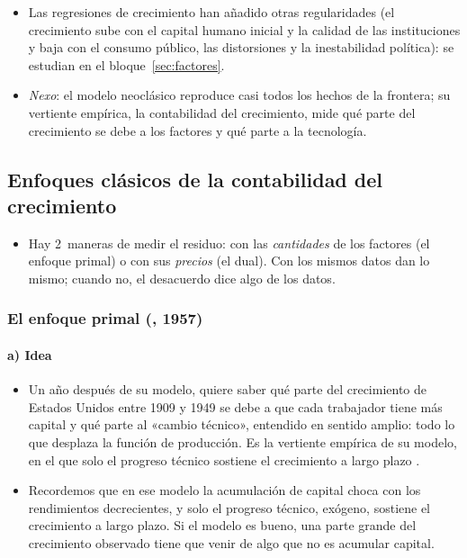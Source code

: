 \documentclass[11pt]{article}
\begin{document}
\begin{itemize}
\item Las regresiones de crecimiento han añadido otras regularidades (el crecimiento sube con el capital humano inicial y la calidad de las instituciones y baja con el consumo público, las distorsiones y la inestabilidad política): se estudian en el bloque~\ref{sec:factores}.
\item \emph{Nexo}: el modelo neoclásico reproduce casi todos los hechos de la frontera; su vertiente empírica, la contabilidad del crecimiento, mide qué parte del crecimiento se debe a los factores y qué parte a la tecnología.
\end{itemize}

\subsection{Enfoques clásicos de la contabilidad del crecimiento}\label{sec:enfoques-clasicos}

\begin{itemize}
\item Hay 2~maneras de medir el residuo: con las \emph{cantidades} de los factores (el enfoque primal) o con sus \emph{precios} (el dual). Con los mismos datos dan lo mismo; cuando no, el desacuerdo dice algo de los datos.
\end{itemize}

\subsubsection{El enfoque primal (, 1957)}\label{sec:primal}

\paragraph{a) Idea}

\begin{itemize}
\item Un año después de su modelo, \textcite{Solow1957} quiere saber qué parte del crecimiento de Estados Unidos entre 1909 y 1949 se debe a que cada trabajador tiene más capital y qué parte al «cambio técnico», entendido en sentido amplio: todo lo que desplaza la función de producción. Es la vertiente empírica de su modelo, en el que solo el progreso técnico sostiene el crecimiento a largo plazo .
\item Recordemos que en ese modelo la acumulación de capital choca con los rendimientos decrecientes, y solo el progreso técnico, exógeno, sostiene el crecimiento a largo plazo. Si el modelo es bueno, una parte grande del crecimiento observado tiene que venir de algo que no es acumular capital.
\end{itemize}
\end{document}
